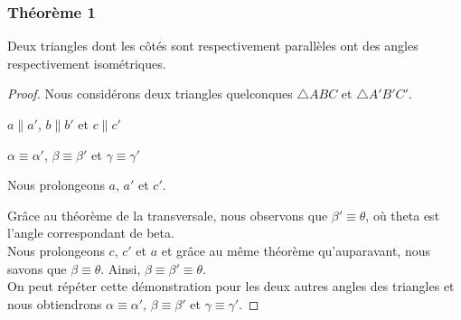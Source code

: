 \documentclass[a4paper,12pt]{article}
\begin{document}
\subsubsection{Théorème 1}
\begin{theorem}
Deux triangles dont les côtés sont respectivement parallèles ont des angles respectivement isométriques.
\end{theorem}

\begin{proof}
Nous considérons deux triangles quelconques $\triangle ABC$ et $\triangle A'B'C'$.


\begin{hyp}
$a \parallel a'$, $b \parallel b'$ et $c \parallel c'$
\end{hyp}
\begin{concl}
$\alpha \equiv \alpha'$, $\beta \equiv \beta'$ et $\gamma \equiv \gamma'$
\end{concl}
Nous prolongeons $a$, $a'$ et $c'$. 


Grâce au théorème de la transversale, nous observons que $\beta' \equiv \theta$, où theta est l'angle correspondant de beta.\\
Nous prolongeons $c$, $c'$ et $a$ et grâce au même théorème qu'auparavant, nous savons que $\beta \equiv \theta$.
Ainsi, $\beta \equiv \beta' \equiv \theta$.\\
On peut répéter cette démonstration pour les deux autres angles des triangles et nous obtiendrons $\alpha \equiv \alpha'$, $\beta \equiv \beta'$ et $\gamma \equiv \gamma'$.


\end{proof}
\end{document}

